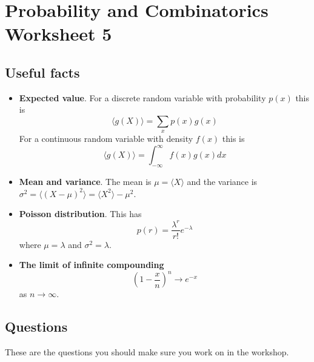 \documentclass[11pt,a4paper]{scrartcl}
\begin{document}
\section*{Probability and Combinatorics Worksheet 5}

\subsection*{Useful facts}

\begin{itemize}

\item \textbf{Expected value}. For a discrete random variable with probability $p(x)$ this is
\begin{equation}
\langle g(X) \rangle = \sum_x p(x)g(x)
\end{equation}
For a continuous random variable with density $f(x)$ this is
\begin{equation}
\langle g(X)\rangle = \int_{-\infty}^\infty{f(x)g(x)}dx
\end{equation}


\item \textbf{Mean and variance}. The mean is $\mu=\langle X\rangle$ and the variance is $\sigma^2=\langle(X-\mu)^2\rangle=\langle X^2\rangle - \mu^2$.


\item \textbf{Poisson distribution}. This has
\begin{equation}
p(r)=\frac{\lambda^r}{r!}e^{-\lambda}
\end{equation}
where $\mu=\lambda$ and $\sigma^2=\lambda$.


\item \textbf{The limit of infinite compounding}
  \begin{equation}
    \left(1-\frac{x}{n}\right)^n\rightarrow e^{-x}
  \end{equation}
  as $n\rightarrow\infty$.

  
\end{itemize}



\subsection*{Questions}

These are the questions you should make sure you work on in the workshop.
\end{document}
